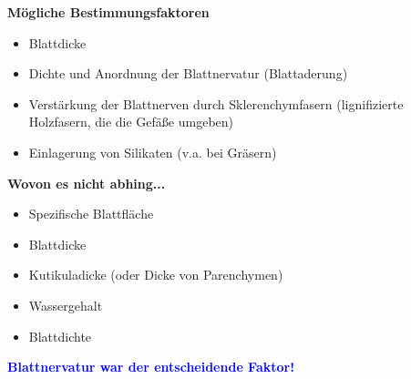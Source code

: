 \newpage
\textbf{Mögliche Bestimmungsfaktoren}
\begin{itemize}
	\item Blattdicke
	\item Dichte und Anordnung der Blattnervatur (Blattaderung)
	\item Verstärkung der Blattnerven durch Sklerenchymfasern (lignifizierte Holzfasern, die die Gefäße umgeben)
	\item Einlagerung von Silikaten (v.a. bei Gräsern)
\end{itemize}

\textbf{Wovon es nicht abhing...}
\begin{itemize}
	\item Spezifische Blattfläche
	\item Blattdicke
	\item Kutikuladicke (oder Dicke von Parenchymen)
	\item Wassergehalt
	\item Blattdichte
\end{itemize}

\textcolor{blue}{\textbf{Blattnervatur war der entscheidende Faktor!}}